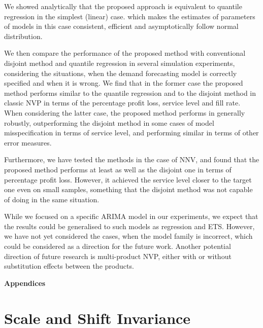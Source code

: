 \documentclass{article}
\begin{document}
We showed analytically that the proposed approach is equivalent to quantile regression in the simplest (linear) case.  which makes the estimates of parameters of models in this case consistent, efficient and asymptotically follow normal distribution.

We then compare the performance of the proposed method with conventional disjoint method and quantile regression in several simulation experiments, considering the situations, when the demand forecasting model is correctly specified and when it is wrong. We find that in the former case the proposed method performs similar to the quantile regression and to the disjoint method in classic NVP in terms of the percentage profit loss, service level and fill rate. When considering the latter case, the proposed method performs in generally robustly, outperforming the disjoint method in some cases of model misspecification in terms of service level, and performing similar in terms of other error measures.

Furthermore, we have tested the methods in the case of NNV, and found that the proposed method performs at least as well as the disjoint one in terms of percentage profit loss. However, it achieved the service level closer to the target one even on small samples, something that the disjoint method was not capable of doing in the same situation.

While we focused on a specific ARIMA model in our experiments, we expect that the results could be generalised to such models as regression and ETS. However, we have not yet considered the cases, when the model family is incorrect, which could be considered as a direction for the future work. Another potential direction of future research is multi-product NVP, either with or without substitution effects between the products.

\printbibliography

\newpage
\begin{center}
{\bf\Large Appendices}
\end{center}

\appendix

\section{Scale and Shift Invariance}
\label{app:A}
\end{document}
